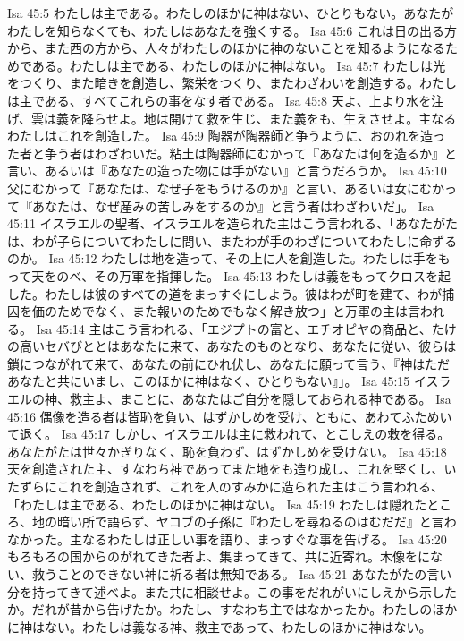 Isa 45:5  わたしは主である。わたしのほかに神はない、ひとりもない。あなたがわたしを知らなくても、わたしはあなたを強くする。
Isa 45:6  これは日の出る方から、また西の方から、人々がわたしのほかに神のないことを知るようになるためである。わたしは主である、わたしのほかに神はない。
Isa 45:7  わたしは光をつくり、また暗きを創造し、繁栄をつくり、またわざわいを創造する。わたしは主である、すべてこれらの事をなす者である。
Isa 45:8  天よ、上より水を注げ、雲は義を降らせよ。地は開けて救を生じ、また義をも、生えさせよ。主なるわたしはこれを創造した。
Isa 45:9  陶器が陶器師と争うように、おのれを造った者と争う者はわざわいだ。粘土は陶器師にむかって『あなたは何を造るか』と言い、あるいは『あなたの造った物には手がない』と言うだろうか。
Isa 45:10  父にむかって『あなたは、なぜ子をもうけるのか』と言い、あるいは女にむかって『あなたは、なぜ産みの苦しみをするのか』と言う者はわざわいだ」。
Isa 45:11  イスラエルの聖者、イスラエルを造られた主はこう言われる、「あなたがたは、わが子らについてわたしに問い、またわが手のわざについてわたしに命ずるのか。
Isa 45:12  わたしは地を造って、その上に人を創造した。わたしは手をもって天をのべ、その万軍を指揮した。
Isa 45:13  わたしは義をもってクロスを起した。わたしは彼のすべての道をまっすぐにしよう。彼はわが町を建て、わが捕囚を価のためでなく、また報いのためでもなく解き放つ」と万軍の主は言われる。
Isa 45:14  主はこう言われる、「エジプトの富と、エチオピヤの商品と、たけの高いセバびととはあなたに来て、あなたのものとなり、あなたに従い、彼らは鎖につながれて来て、あなたの前にひれ伏し、あなたに願って言う、『神はただあなたと共にいまし、このほかに神はなく、ひとりもない』」。
Isa 45:15  イスラエルの神、救主よ、まことに、あなたはご自分を隠しておられる神である。
Isa 45:16  偶像を造る者は皆恥を負い、はずかしめを受け、ともに、あわてふためいて退く。
Isa 45:17  しかし、イスラエルは主に救われて、とこしえの救を得る。あなたがたは世々かぎりなく、恥を負わず、はずかしめを受けない。
Isa 45:18  天を創造された主、すなわち神であってまた地をも造り成し、これを堅くし、いたずらにこれを創造されず、これを人のすみかに造られた主はこう言われる、「わたしは主である、わたしのほかに神はない。
Isa 45:19  わたしは隠れたところ、地の暗い所で語らず、ヤコブの子孫に『わたしを尋ねるのはむだだ』と言わなかった。主なるわたしは正しい事を語り、まっすぐな事を告げる。
Isa 45:20  もろもろの国からのがれてきた者よ、集まってきて、共に近寄れ。木像をにない、救うことのできない神に祈る者は無知である。
Isa 45:21  あなたがたの言い分を持ってきて述べよ。また共に相談せよ。この事をだれがいにしえから示したか。だれが昔から告げたか。わたし、すなわち主ではなかったか。わたしのほかに神はない。わたしは義なる神、救主であって、わたしのほかに神はない。

